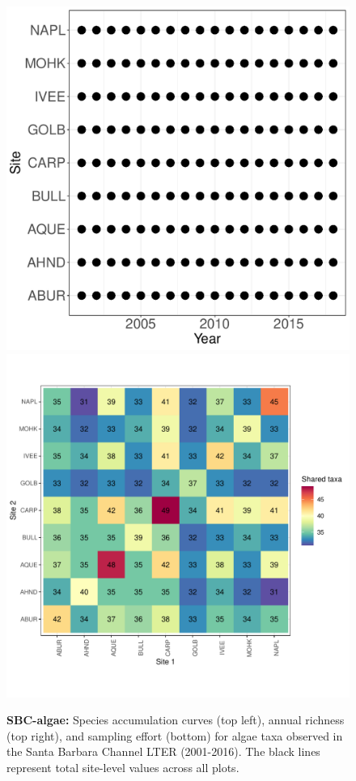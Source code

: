 \documentclass[11pt, oneside]{article}
\begin{document}
\begin{figure}[h!]
\includegraphics[scale = 0.4]{sbc-algae-castorani_spatiotemporal_sampling_effort.pdf}
\includegraphics[scale = 0.4]{sbc-algae-castorani_spp_shared.pdf}
\caption{{\bf SBC-algae:} Species accumulation curves (top left),  annual richness (top right), and sampling effort (bottom)  for algae taxa observed in the Santa Barbara Channel LTER (2001-2016). The black lines represent total site-level values across all plots.}
\label{sbc-algae}
\end{figure}
\end{document}
